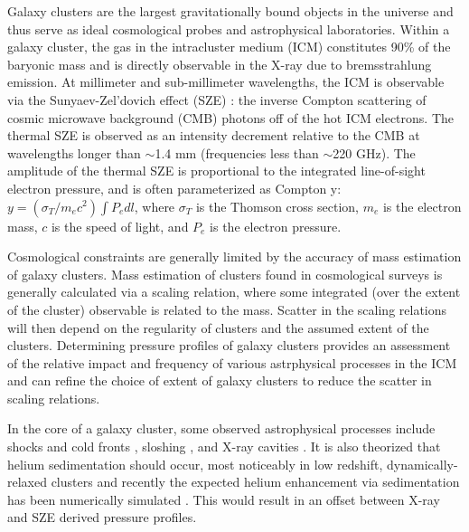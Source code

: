 

Galaxy clusters are the largest gravitationally bound objects in the universe and thus serve as ideal cosmological probes 
and astrophysical laboratories. Within a galaxy cluster, the gas in the intracluster medium (ICM) constitutes 90\% of the
baryonic mass \citep{vikhlinin2006b} and is directly observable in the X-ray due to bremsstrahlung emission. 
At millimeter and sub-millimeter wavelengths, the ICM is observable via the Sunyaev-Zel'dovich effect (SZE) 
\citep{sunyaev1972}: the inverse Compton scattering of cosmic microwave background (CMB) photons off of
the hot ICM electrons. The thermal SZE is observed as an intensity decrement relative to the CMB at wavelengths longer 
than $\sim$1.4 mm (frequencies less than $\sim$220 GHz). The amplitude of the thermal SZE is proportional to the integrated
line-of-sight electron pressure, and is often parameterized as Compton y: $y = (\sigma_T / m_e c^2) \int P_e dl$, where
$\sigma_T$ is the Thomson cross section, $m_e$ is the electron mass, $c$ is the speed of light, and $P_e$ is the electron
pressure.

Cosmological constraints are generally limited by the accuracy of mass estimation of galaxy clusters. Mass estimation of
clusters found in cosmological surveys is generally calculated via a scaling relation, where some integrated (over the extent
of the cluster) observable is related to the mass. Scatter in the scaling relations will then depend on the regularity of
clusters and the assumed extent of the clusters. Determining pressure profiles of galaxy clusters provides an assessment of 
the relative impact and frequency of various astrphysical processes in the ICM and can refine the choice of extent of 
galaxy clusters to reduce the scatter in scaling relations.

In the core of a galaxy cluster, some observed astrophysical processes include shocks and cold fronts 
\citep[e.g.][]{markevitch2007}, sloshing \citep[e.g.][]{fabian2006}, and X-ray cavities \citep{mcnamara2007}. 
It is also theorized that helium sedimentation should occur, most noticeably in low redshift, dynamically-relaxed 
clusters \citep{abramopoulos1981, gilfanov1984} 
and recently the expected helium enhancement via sedimentation has been numerically simulated \citep{peng2009}. 
This would result in an offset between X-ray and SZE derived pressure profiles.

